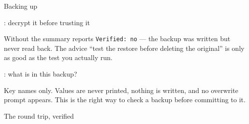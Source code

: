\begin{frame}[fragile]{Backing up}
\end{frame}

\begin{frame}[fragile]{: decrypt it before trusting it}

  {\footnotesize Without  the summary reports
  \texttt{Verified: no} — the backup was written but never read back. The advice
  ``test the restore before deleting the original'' is only as good as the test
  you actually run.}
\end{frame}

\begin{frame}[fragile]{: what is in this backup?}

  {\footnotesize Key names only. Values are never printed, nothing is written,
  and no overwrite prompt appears. This is the right way to check a backup
  before committing to it.}
\end{frame}

\begin{frame}[fragile]{The round trip, verified}
  \vspace{-0.3em}
\end{frame}

